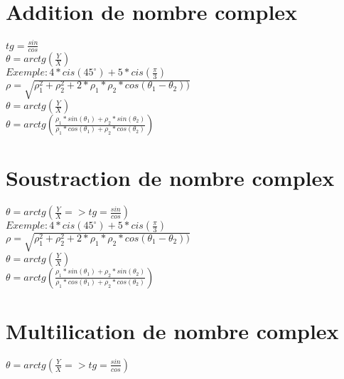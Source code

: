 \vspace{4mm} %
\section{Addition de nombre complex}

$tg = \frac{sin}{cos}$ \\
$\theta = arctg(\frac{Y}{X})$ \\

$ Exemple : 4*cis(45^{\circ}) + 5*cis(\frac{\pi}{3})$\\

$\rho = \sqrt{\rho_1^{2}+\rho_2^{2} + 2 * \rho_1 * \rho_2 * cos(\theta_1-\theta_2))}$ \\

$\theta = arctg(\frac{Y}{X})$\\

$\theta = arctg(\frac{\rho_1 * sin(\theta_1) + \rho_2 * sin(\theta_2)} {\rho_1 * cos(\theta_1) + \rho_2 * cos(\theta_2)})$ \\

\vspace{4mm} %
\section{Soustraction de nombre complex}

$\theta = arctg(\frac{Y}{X} => tg = \frac{sin}{cos} )$ \\

$ Exemple : 4*cis(45^{\circ}) + 5*cis(\frac{\pi}{3})$\\

$\rho = \sqrt{\rho_1^{2}+\rho_2^{2} + 2 * \rho_1 * \rho_2 * cos(\theta_1-\theta_2))}$ \\

$\theta = arctg(\frac{Y}{X})$\\

$\theta = arctg(\frac{\rho_1 * sin(\theta_1) + \rho_2 * sin(\theta_2)} {\rho_1 * cos(\theta_1) + \rho_2 * cos(\theta_2)})$ \\

\vspace{4mm} %
\section{Multilication de nombre complex}

$\theta = arctg(\frac{Y}{X} => tg = \frac{sin}{cos} )$ \\

